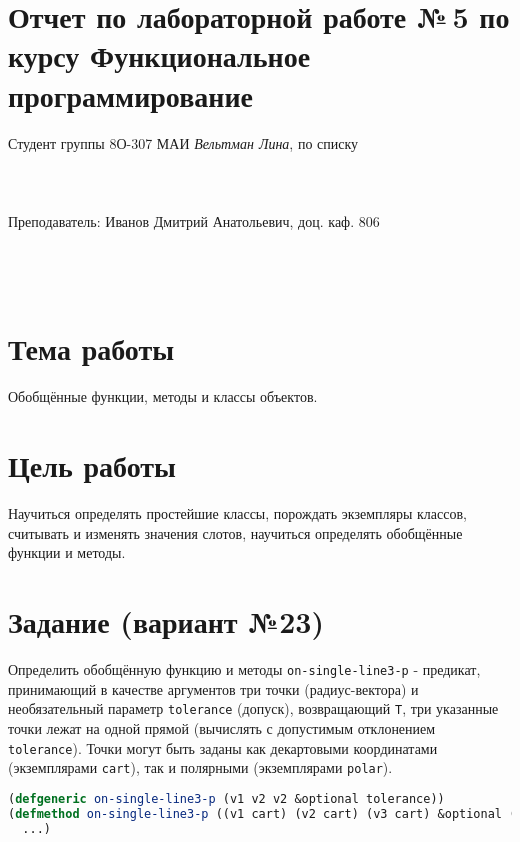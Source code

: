 \documentclass[12pt]{article}
\begin{document}
\section*{Отчет по лабораторной работе №\,5 
по курсу \guillemotleft  Функциональное программирование\guillemotright}
\begin{flushright}
Студент группы 8О-307 МАИ \textit{Вельтман Лина},  по списку \\
 \\
 \\
\ \\
Преподаватель: Иванов Дмитрий Анатольевич, доц. каф. 806 \\
 \\
 \\
 \\

\end{flushright}

\section{Тема работы}
Обобщённые функции, методы и классы объектов.

\section{Цель работы}
Научиться определять простейшие классы, порождать экземпляры классов, считывать и изменять значения слотов, научиться определять обобщённые функции и методы.

\section{Задание (вариант №23)}
Определить обобщённую функцию и методы {\tt on-single-line3-p} - предикат,
принимающий в качестве аргументов три точки (радиус-вектора) и необязательный параметр {\tt tolerance} (допуск),
возвращающий {\tt T}, три указанные точки лежат на одной прямой (вычислять с допустимым отклонением {\tt tolerance}).
Точки могут быть заданы как декартовыми координатами (экземплярами {\tt cart}), так и полярными (экземплярами {\tt polar}).

\begin{lstlisting}[language=Lisp]
(defgeneric on-single-line3-p (v1 v2 v2 &optional tolerance))
(defmethod on-single-line3-p ((v1 cart) (v2 cart) (v3 cart) &optional (tolerance 0.001))
  ...)
\end{lstlisting}
\end{document}
